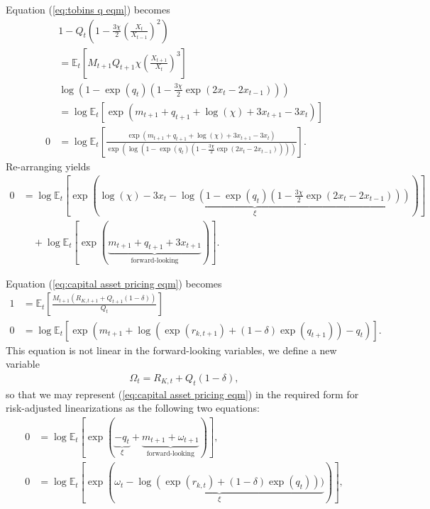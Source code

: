 \documentclass[12 pt, oneside]{article}
\theoremstyle{definition}
\theoremstyle{definition}
\theoremstyle{definition}
\newcommand{\E}{\mathbb{E}}
\begin{document}
Equation (\ref{eq:tobins q eqm}) becomes
\begin{align*}
  & 1 - Q_t\left(1 - \frac{3\chi}{2}\left(\frac{X_t}{X_{t - 1}}\right)^2\right)\\
  & = \E_t\left[M_{t + 1}Q_{t + 1}\chi\left(\frac{X_{t + 1}}{X_t}\right)^3\right]\\
  & \log\left(1 - \exp(q_t)\left(1 - \frac{3\chi}{2}\exp(2x_t - 2x_{t - 1})\right)\right)\\
  & = \log\E_t\left[\exp\left(m_{t + 1} + q_{t + 1} + \log(\chi) + 3 x_{t + 1} - 3 x_t\right)\right]\\
  0 & = \log\E_t\left[\frac{\exp\left(m_{t + 1} + q_{t + 1} + \log(\chi) + 3 x_{t + 1} - 3 x_t\right)}{\exp\left(\log\left(1 - \exp(q_t)\left(1 - \frac{3\chi}{2}\exp(2x_t - 2x_{t - 1})\right)\right)\right)}\right].
\end{align*}
Re-arranging yields
\begin{align*}
  0 & = \log\E_t\left[\exp\left(\underbrace{\log(\chi)- 3x_t - \log\left(1 - \exp(q_t)\left(1 - \frac{3\chi}{2}\exp(2x_t - 2x_{t - 1})\right)\right)}_{\xi}\right)\right]\\
    &\quad + \log \E_t\left[\exp(\underbrace{m_{t + 1} + q_{t + 1} + 3x_{t + 1}}_{\text{forward-looking}})\right].
\end{align*}

Equation (\ref{eq:capital asset pricing eqm}) becomes
\begin{align*}
  1 & = \E_t\left[\frac{M_{t + 1} (R_{K, t + 1} + Q_{t + 1}(1 - \delta))}{Q_t}\right]\\
  0 & = \log\E_t\left[\exp\left(m_{t + 1} + \log(\exp(r_{k, t + 1}) + (1-\delta)\exp(q_{t + 1})) - q_t\right)\right].
\end{align*}
This equation is not linear in the forward-looking variables, we define a new variable
\begin{align}\label{eq:Omega defn}
  \Omega_t = R_{K, t} + Q_t(1 - \delta),
\end{align}
so that we may represent (\ref{eq:capital asset pricing eqm}) in the required form for risk-adjusted linearizations as the following two equations:
\begin{align*}
  0 & = \log\E_t\left[\exp\left(\underbrace{-q_t}_{\xi} + \underbrace{m_{t + 1} + \omega_{t + 1}}_{\text{forward-looking}}\right)\right],\\
  0 & = \log\E_t\left[\exp\left(\underbrace{\omega_t - \log(\exp(r_{k, t}) +  (1 - \delta)\exp(q_t)))}_{\xi} \right)\right],\\
\end{align*}
\end{document}
